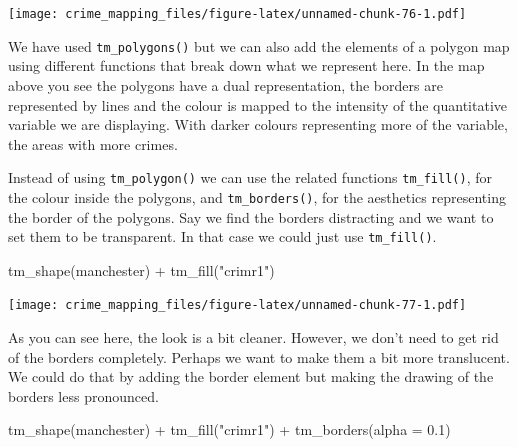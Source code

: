 \documentclass[
]{book}
\newenvironment{Shaded}{\begin{snugshade}}{\end{snugshade}}
\newcommand{\AttributeTok}[1]{\textcolor[rgb]{0.77,0.63,0.00}{#1}}
\newcommand{\FloatTok}[1]{\textcolor[rgb]{0.00,0.00,0.81}{#1}}
\newcommand{\FunctionTok}[1]{\textcolor[rgb]{0.00,0.00,0.00}{#1}}
\newcommand{\NormalTok}[1]{#1}
\newcommand{\SpecialCharTok}[1]{\textcolor[rgb]{0.00,0.00,0.00}{#1}}
\newcommand{\StringTok}[1]{\textcolor[rgb]{0.31,0.60,0.02}{#1}}
\begin{document}
\texttt{[image: crime\_mapping\_files/figure-latex/unnamed-chunk-76-1.pdf]}

We have used \texttt{tm\_polygons()} but we can also add the elements of a polygon map using different functions that break down what we represent here. In the map above you see the polygons have a dual representation, the borders are represented by lines and the colour is mapped to the intensity of the quantitative variable we are displaying. With darker colours representing more of the variable, the areas with more crimes.

Instead of using \texttt{tm\_polygon()} we can use the related functions \texttt{tm\_fill()}, for the colour inside the polygons, and \texttt{tm\_borders()}, for the aesthetics representing the border of the polygons. Say we find the borders distracting and we want to set them to be transparent. In that case we could just use \texttt{tm\_fill()}.

\begin{Shaded}
\begin{Highlighting}[]
\FunctionTok{tm\_shape}\NormalTok{(manchester) }\SpecialCharTok{+} 
  \FunctionTok{tm\_fill}\NormalTok{(}\StringTok{"crimr1"}\NormalTok{)}
\end{Highlighting}
\end{Shaded}

\texttt{[image: crime\_mapping\_files/figure-latex/unnamed-chunk-77-1.pdf]}

As you can see here, the look is a bit cleaner. However, we don't need to get rid of the borders completely. Perhaps we want to make them a bit more translucent. We could do that by adding the border element but making the drawing of the borders less pronounced.

\begin{Shaded}
\begin{Highlighting}[]
\FunctionTok{tm\_shape}\NormalTok{(manchester) }\SpecialCharTok{+} 
  \FunctionTok{tm\_fill}\NormalTok{(}\StringTok{"crimr1"}\NormalTok{) }\SpecialCharTok{+}
  \FunctionTok{tm\_borders}\NormalTok{(}\AttributeTok{alpha =} \FloatTok{0.1}\NormalTok{)}
\end{Highlighting}
\end{Shaded}
\end{document}
